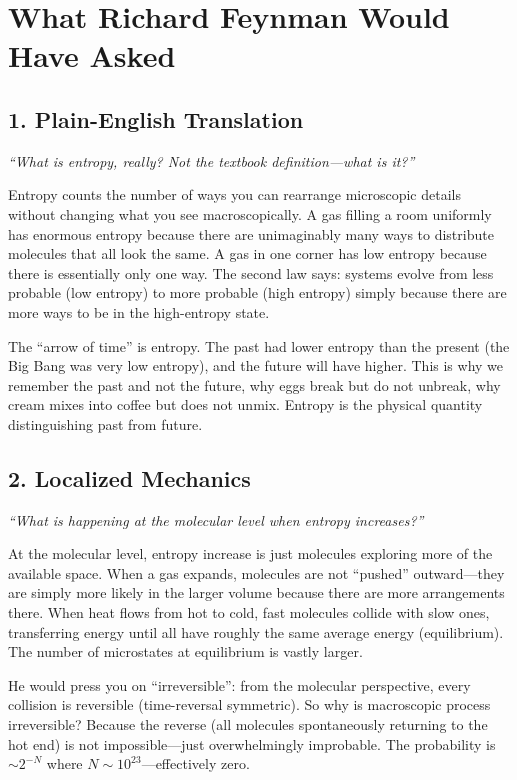 \section*{What Richard Feynman Would Have Asked}

\subsection*{1. Plain-English Translation}
\textit{``What is entropy, really? Not the textbook definition---what is it?''}

Entropy counts the number of ways you can rearrange microscopic details without changing what you see macroscopically. A gas filling a room uniformly has enormous entropy because there are unimaginably many ways to distribute molecules that all look the same. A gas in one corner has low entropy because there is essentially only one way. The second law says: systems evolve from less probable (low entropy) to more probable (high entropy) simply because there are more ways to be in the high-entropy state.

The ``arrow of time'' is entropy. The past had lower entropy than the present (the Big Bang was very low entropy), and the future will have higher. This is why we remember the past and not the future, why eggs break but do not unbreak, why cream mixes into coffee but does not unmix. Entropy is the physical quantity distinguishing past from future.

\subsection*{2. Localized Mechanics}
\textit{``What is happening at the molecular level when entropy increases?''}

At the molecular level, entropy increase is just molecules exploring more of the available space. When a gas expands, molecules are not ``pushed'' outward---they are simply more likely in the larger volume because there are more arrangements there. When heat flows from hot to cold, fast molecules collide with slow ones, transferring energy until all have roughly the same average energy (equilibrium). The number of microstates at equilibrium is vastly larger.

He would press you on ``irreversible'': from the molecular perspective, every collision is reversible (time-reversal symmetric). So why is macroscopic process irreversible? Because the reverse (all molecules spontaneously returning to the hot end) is not impossible---just overwhelmingly improbable. The probability is $\sim 2^{-N}$ where $N \sim 10^{23}$---effectively zero.

